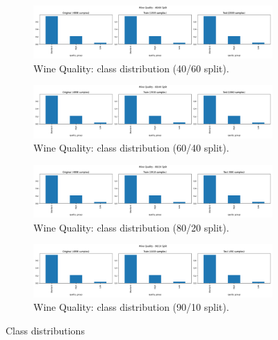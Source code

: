 \begin{figure}[H]
	\centering
	\begin{subfigure}{0.45\textwidth}
		\centering
		\includegraphics[width=\textwidth]{imgs/class_dist/class_dist__wine_quality__40_vs_60.png}
		\caption{Wine Quality: class distribution (40/60 split).}\label{fig:wq-cd-40-60}
	\end{subfigure}
	\hfill
	\begin{subfigure}{0.45\textwidth}
		\centering
		\includegraphics[width=\textwidth]{imgs/class_dist/class_dist__wine_quality__60_vs_40.png}
		\caption{Wine Quality: class distribution (60/40 split).}\label{fig:wq-cd-60-40}
	\end{subfigure}
	\hfill
	\begin{subfigure}{0.45\textwidth}
		\centering
		\includegraphics[width=\textwidth]{imgs/class_dist/class_dist__wine_quality__80_vs_20.png}
		\caption{Wine Quality: class distribution (80/20 split).}\label{fig:wq-cd-80-20}
	\end{subfigure}
	\hfill
	\begin{subfigure}{0.45\textwidth}
		\centering
		\includegraphics[width=\textwidth]{imgs/class_dist/class_dist__wine_quality__90_vs_10.png}
		\caption{Wine Quality: class distribution (90/10 split).}\label{fig:wq-cd-90-10}
	\end{subfigure}

	\caption{Class distributions}\label{fig:wq-cd-all}
\end{figure}

